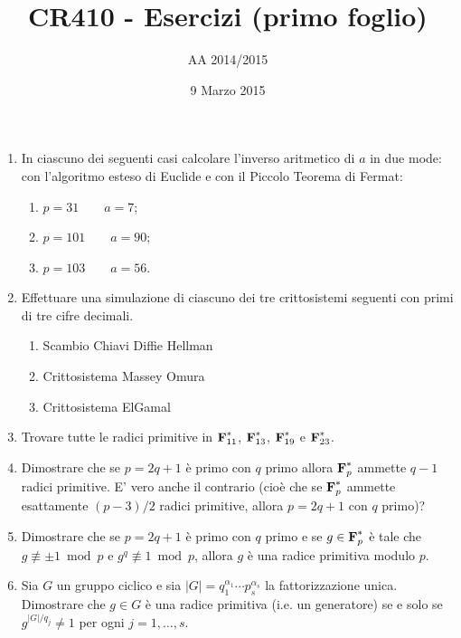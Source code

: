 \documentclass[a4paper,10pt]{article}
\title{CR410 - Esercizi (primo foglio)}
\author{AA 2014/2015}
\date{9 Marzo 2015}
\begin{document}
\maketitle

\begin{enumerate}
 \item In ciascuno dei seguenti casi calcolare l'inverso aritmetico 
 di $a$ in due mode: con l'algoritmo esteso di Euclide e con il Piccolo 
 Teorema di Fermat:
 \begin{enumerate}
  \item $p=31 \qquad a=7$;
  \item $p=101 \qquad a=90$;
  \item $p=103 \qquad a=56$.
 \end{enumerate}
\item Effettuare una simulazione di ciascuno dei tre crittosistemi seguenti con primi di tre cifre decimali.
\begin{enumerate}
\item Scambio Chiavi Diffie Hellman
\item Crittosistema Massey Omura
\item Crittosistema ElGamal
\end{enumerate}
\item Trovare tutte le radici primitive in $\textbf F_{11}^*$, $\textbf F_{13}^*$, $\textbf F_{19}^*$ e $\textbf F_{23}^*$.
\item Dimostrare che se $p=2q+1$ è primo con $q$ primo allora $\textbf F_{p}^*$ ammette $q-1$ radici primitive. E' vero
anche il contrario (cioè che se $\textbf F_{p}^*$ ammette esattamente $(p-3)/2$ radici primitive, allora $p=2q+1$ con $q$ primo)?
\item Dimostrare che se $p=2q+1$ è primo con $q$ primo e se $g\in\textbf F_{p}^*$ è tale che $g\not\equiv\pm1\bmod p$ e
$g^q\not\equiv1\bmod p$, allora $g$ è una radice primitiva modulo $p$.
\item Sia $G$ un gruppo ciclico e sia $|G|=q_1^{\alpha_1}\cdots p_s^{\alpha_s}$ la fattorizzazione unica. Dimostrare che $g\in G$
è una radice primitiva (i.e. un generatore) se e solo se $g^{|G|/q_j}\ne1$ per ogni $j=1,\ldots,s$.
\end{enumerate}
\end{document}
